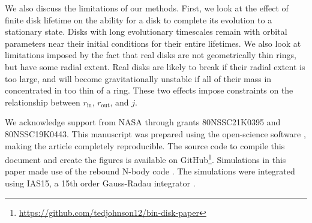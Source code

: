 \documentclass[twocolumn]{aastex631}
\newcommand\ghurl[0]{\url{https://github.com/tedjohnson12/bin-disk-paper}}
\begin{document}
We also discuss the limitations of our methods. First, we look at the effect of finite disk lifetime on the ability for a disk to complete its evolution to a stationary state. Disks with long evolutionary timescales remain with orbital parameters near their initial conditions for their entire lifetimes. We also look at limitations imposed by the fact that real disks are not geometrically thin rings, but have some radial extent. Real disks are likely to break if their radial extent is too large, and will become gravitationally unstable if all of their mass in concentrated in too thin of a ring. These two effects impose constraints on the relationship between $r_\text{in}$, $r_\text{out}$, and $j$.




\begin{acknowledgements}
\label{sec:ack}

We acknowledge support from NASA through grants 80NSSC21K0395 and 80NSSC19K0443. This manuscript was prepared using the open-science software \href{https://show-your.work/en/latest/intro/}{\showyourwork} \citep{luger2021}, making the article completely
reproducible. The source code to compile this document and create the figures is available on GitHub\footnote{\ghurl}.
Simulations in this paper made use of the {\sc rebound} N-body code \citep{rebound}.
The simulations were integrated using IAS15, a 15th order Gauss-Radau integrator \citep{reboundias15}. 

\end{acknowledgements}


\end{document}
